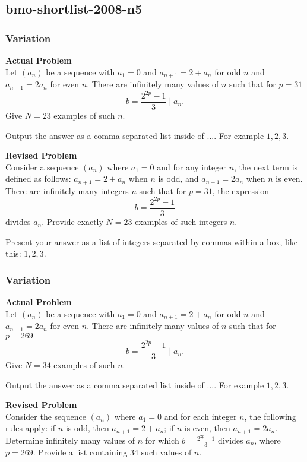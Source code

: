 \subsection{bmo-shortlist-2008-n5}
\subsubsection{Variation}
\textbf{Actual Problem}\\
Let $(a_n)$ be a sequence with $a_1=0$ and $a_{n+1}=2+a_n$ for odd $n$ and $a_{n+1}=2a_n$ for even $n$. There are infinitely many values of $n$ such that for $p=31$
$$ b=\frac{2^{2p}-1}{3} \mid a_n. $$ Give $N=23$ examples of such $n$.

Output the answer as a comma separated list inside of $\boxed{...}$. For example $\boxed{1, 2, 3}$.

\textbf{Revised Problem}\\
Consider a sequence \( (a_n) \) where \( a_1 = 0 \) and for any integer \( n \), the next term is defined as follows: \( a_{n+1} = 2 + a_n \) when \( n \) is odd, and \( a_{n+1} = 2a_n \) when \( n \) is even. There are infinitely many integers \( n \) such that for \( p = 31 \), the expression
\[ b = \frac{2^{2p} - 1}{3} \]
divides \( a_n \). Provide exactly \( N = 23 \) examples of such integers \( n \).

Present your answer as a list of integers separated by commas within a box, like this: \(\boxed{1, 2, 3}\).

\subsubsection{Variation}
\textbf{Actual Problem}\\
Let $(a_n)$ be a sequence with $a_1=0$ and $a_{n+1}=2+a_n$ for odd $n$ and $a_{n+1}=2a_n$ for even $n$. There are infinitely many values of $n$ such that for $p=269$
$$ b=\frac{2^{2p}-1}{3} \mid a_n. $$ Give $N=34$ examples of such $n$.

Output the answer as a comma separated list inside of $\boxed{...}$. For example $\boxed{1, 2, 3}$.

\textbf{Revised Problem}\\
Consider the sequence $(a_n)$ where $a_1 = 0$ and for each integer $n$, the following rules apply: if $n$ is odd, then $a_{n+1} = 2 + a_n$; if $n$ is even, then $a_{n+1} = 2a_n$. Determine infinitely many values of $n$ for which $b = \frac{2^{2p} - 1}{3}$ divides $a_n$, where $p = 269$. Provide a list containing 34 such values of $n$.

